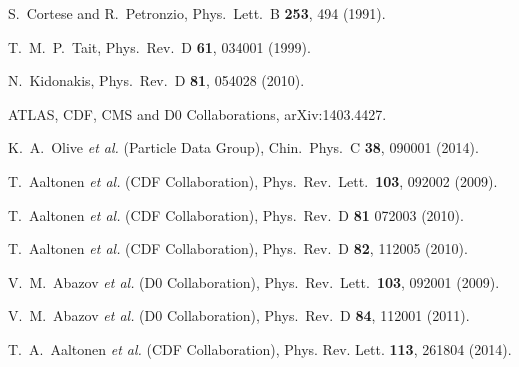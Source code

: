 \documentclass[aps,prl,twocolumn,showpacs,superscriptaddress,groupedaddress]{revtex4}  %
\begin{document}
\begin{thebibliography}{99}
S.~Cortese and R.~Petronzio,
Phys.\ Lett.\ B {\bf 253}, 494 (1991).

  T.~M.~P.~Tait,
  Phys.\ Rev.\ D {\bf 61}, 034001 (1999).

  N.~Kidonakis,
  Phys.\ Rev.\ D {\bf 81}, 054028 (2010).

ATLAS, CDF, CMS and D0 Collaborations,
  arXiv:1403.4427.
 
K.~A.~Olive {\it et al.}  (Particle Data Group),
  Chin.\ Phys.\ C {\bf 38}, 090001 (2014).

T.~Aaltonen {\it et al.} (CDF Collaboration),
Phys.\ Rev.\ Lett.\ {\bf 103}, 092002 (2009).

  T.~Aaltonen {\it et al.}  (CDF Collaboration),
  Phys.\ Rev.\ D {\bf 81} 072003 (2010).

  T.~Aaltonen {\it et al.}  (CDF Collaboration),
  Phys.\ Rev.\ D {\bf 82}, 112005 (2010).

V.~M.~Abazov {\it et al.} (D0 Collaboration),
Phys.\ Rev.\ Lett.\ {\bf 103}, 092001 (2009).

  V.~M.~Abazov {\it et al.}  (D0 Collaboration),
  Phys.\ Rev.\ D {\bf 84}, 112001 (2011).

  T.~A.~Aaltonen {\it et al.}  (CDF Collaboration),
Phys. Rev. Lett. {\bf 113}, 261804 (2014).


\end{thebibliography}
\end{document}
